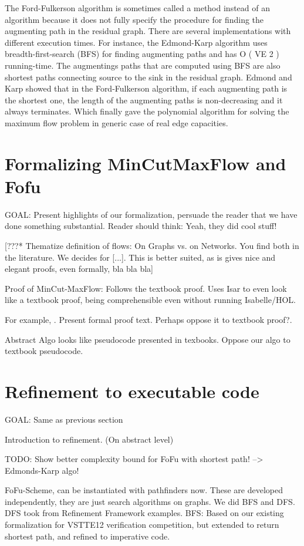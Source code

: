 \documentclass{llncs}
\begin{document}
The Ford-Fulkerson algorithm is sometimes called a method instead of an algorithm because it does not fully specify the procedure for finding the augmenting path in the residual graph. There are several implementations with different execution times. For instance, the Edmond-Karp algorithm uses breadth-first-search (BFS) for finding augmenting paths and has O ( VE 2 ) running-time. The augmentings paths that are computed using BFS are also shortest paths connecting source to the sink in the residual graph. Edmond and Karp showed that in the Ford-Fulkerson algorithm, if each augmenting path is the shortest one, the length of the augmenting paths is non-decreasing and it always terminates. Which finally gave the polynomial algorithm for solving the maximum flow problem in generic case of real edge capacities.


\section{Formalizing MinCutMaxFlow and Fofu}
  GOAL: Present highlights of our formalization, persuade the reader that we have done something substantial.
    Reader should think: Yeah, they did cool stuff!

  [???* Thematize definition of flows: On Graphs vs. on Networks. You find both in the literature. 
      We decides for [...]. This is better suited, as is gives nice and elegant proofs, even formally, bla bla bla]
    
  Proof of MinCut-MaxFlow: Follows the textbook proof.
    Uses Isar to even look like a textbook proof, being comprehensible even without running
      Isabelle/HOL.
      
    For example, .
      Present formal proof text. Perhaps oppose it to textbook proof?.
    
  Abstract Algo looks like pseudocode presented in texbooks.
    Oppose our algo to textbook pseudocode.
    
    
\section{Refinement to executable code}
  GOAL: Same as previous section
  
  Introduction to refinement. (On abstract level)

  TODO: Show better complexity bound for FoFu with shortest path! --> Edmonds-Karp algo!
 
  
  FoFu-Scheme, can be instantiated with pathfinders now.
  These are developed independently, they are just search algorithms on graphs.
    We did BFS and DFS.
      DFS took from Refinement Framework examples.
      BFS: Based on our existing formalization for VSTTE12 verification competition, 
        but extended to return shortest path, and refined to imperative code.
    
\end{document}
